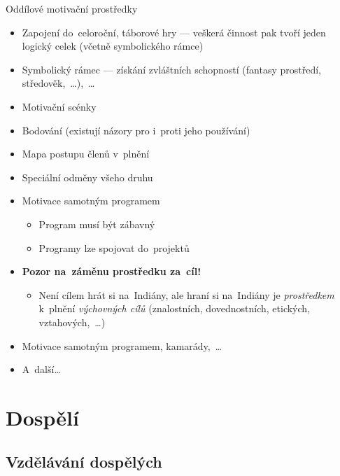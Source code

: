 \documentclass[compress, xelatex, 11pt, xcolor=dvipsnames, aspectratio=169, url={hyphens, lowtilde}]{beamer}
\begin{document}
\begin{frame}{Oddílové motivační prostředky}
	\begin{itemize}
		\item Zapojení do~celoroční, táborové hry --- veškerá činnost pak tvoří jeden logický celek (včetně symbolického rámce)
		\item Symbolický rámec --- získání zvláštních schopností (fantasy prostředí, středověk,~\ldots),~\ldots
		\item Motivační scénky
		\item Bodování (existují názory pro i~proti jeho používání)
		\item Mapa postupu členů v~plnění
		\item Speciální odměny všeho druhu
		\item Motivace samotným programem
		\begin{itemize}
			\item Program musí být zábavný
			\item Programy lze spojovat do~projektů
		\end{itemize}
		\item \textbf{Pozor na~záměnu prostředku za~cíl!}
		\begin{itemize}
			\item Není cílem hrát si na~Indiány, ale hraní si na~Indiány je \textit{prostředkem} k~plnění \textit{výchovných cílů} (znalostních, dovednostních, etických, vztahových,~\ldots)
		\end{itemize}
		\item Motivace samotným programem, kamarády,~\ldots
		\item A~další\ldots
	\end{itemize}
\end{frame}

\section{Dospělí}

\subsection{Vzdělávání dospělých}
\end{document}
